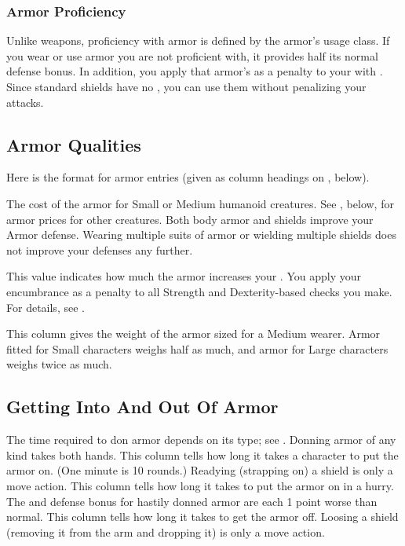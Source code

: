         \subsubsection{Armor Proficiency}\label{Armor Proficiency}
            Unlike weapons, proficiency with armor is defined by the armor's usage class.
            If you wear or use armor you are not proficient with, it provides half its normal defense bonus.
            In addition, you apply that armor's  as a penalty to your  with .
            Since standard shields have no , you can use them without penalizing your attacks.

    \subsection{Armor Qualities}
        \par Here is the format for armor entries (given as column headings on , below).

         The cost of the armor for Small or Medium humanoid creatures.
        See , below, for armor prices for other creatures.
         Both body armor and shields improve your Armor defense.
        Wearing multiple suits of armor or wielding multiple shields does not improve your defenses any further.

         This value indicates how much the armor increases your .
        You apply your encumbrance as a penalty to all Strength and Dexterity-based checks you make.
        For details, see .

         This column gives the weight of the armor sized for a Medium wearer. Armor fitted for Small characters weighs half as much, and armor for Large characters weighs twice as much.

    \subsection{Getting Into And Out Of Armor}
        The time required to don armor depends on its type; see . Donning armor of any kind takes both hands.
         This column tells how long it takes a character to put the armor on. (One minute is 10 rounds.) Readying (strapping on) a shield is only a move action.
         This column tells how long it takes to put the armor on in a hurry. The  and defense bonus for hastily donned armor are each 1 point worse than normal.
         This column tells how long it takes to get the armor off. Loosing a shield (removing it from the arm and dropping it) is only a move action.

